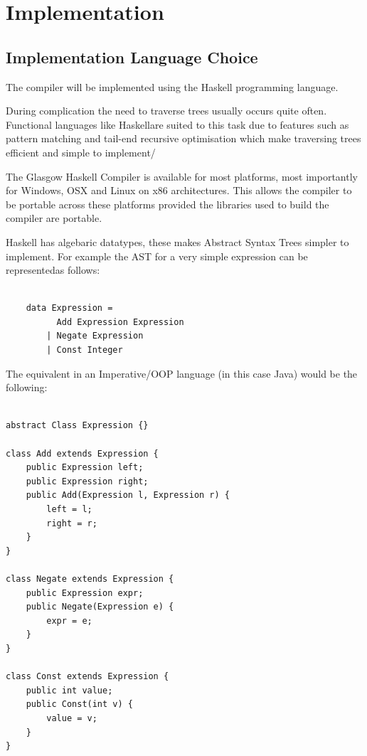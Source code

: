 \chapter{Implementation}


\section{Implementation Language Choice}

The compiler will be implemented using the Haskell programming language.

During complication the need to traverse trees usually occurs quite
often. Functional languages like Haskellare suited to this task 
due to features such as pattern matching and tail-end recursive optimisation 
which make traversing trees efficient and simple to implement/ 

The Glasgow Haskell Compiler is available for most platforms, most importantly for Windows, OSX and Linux 
on x86 architectures. This allows the compiler to be portable across these platforms provided the libraries 
used to build the compiler are portable.

Haskell has algebaric datatypes, these makes Abstract Syntax Trees
simpler to implement. For example the AST for a very simple expression
can be representedas follows:

\begin{lstlisting}[style=myHaskell]

    data Expression =
          Add Expression Expression
        | Negate Expression 
        | Const Integer

\end{lstlisting}

The equivalent in an Imperative/OOP language (in this case Java)
would be the following:

\begin{lstlisting}[style=myJava]

abstract Class Expression {}

class Add extends Expression {
    public Expression left;
    public Expression right;
    public Add(Expression l, Expression r) {
        left = l;
        right = r;    
    } 
}

class Negate extends Expression {
    public Expression expr;
    public Negate(Expression e) {
        expr = e;    
    }
} 

class Const extends Expression {
    public int value;
    public Const(int v) {
        value = v;
    }
}       

\end{lstlisting}

